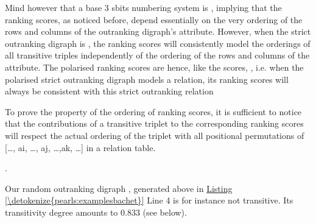 \documentclass[a4paper,12pt,english]{sphinxhowto}
\begin{document}
\sphinxAtStartPar
Mind however that a base 3 sbits numbering system is , implying that the  ranking scores, as noticed before, depend essentially on the very ordering of the rows and columns of the outranking digraph’s  attribute. However, when the strict outranking digraph is , the  ranking scores will consistently model the orderings of all transitive triples independently of the ordering of the rows and columns of the  attribute. The polarised  ranking scores are hence, like the  scores, , i.e. when the polarised strict outranking digraph models a  relation, its  ranking scores will always be consistent with this strict outranking relation %
\begin{footnote}[23]\sphinxAtStartFootnote
To prove the  property of the ordering of  ranking scores, it is sufficient to notice that the contributions of a transitive triplet  to the corresponding  ranking scores will respect the actual ordering of the triplet with all positional permutations of {[}…, ai, …, aj, …,ak, …{]} in a relation table.
%
\end{footnote}.

\sphinxAtStartPar
Our random outranking digraph , generated above in \hyperref[\detokenize{pearls:examplesbachet}]{Listing \ref{\detokenize{pearls:examplesbachet}}} Line 4 is for instance not transitive. Its transitivity degree amounts to 0.833 (see below).
\end{document}
